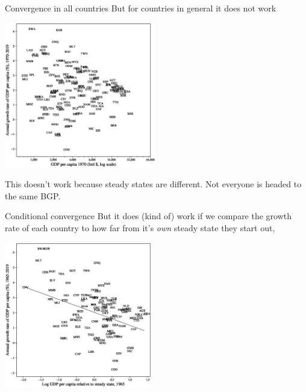 \begin{frame}{Convergence in all countries}
But for countries in general it does not work
\begin{center}
\includegraphics[height = 2.5in]{../Figures/fig-ch3-fig8.eps}
\end{center}
This doesn't work because steady states are different. Not everyone is headed to the same BGP.
\end{frame}

\begin{frame}{Conditional convergence}
But it does (kind of) work if we compare the growth rate of each country to how far from it's \textit{own} steady state they start out,
\begin{center}
\includegraphics[height = 2.5in]{../Figures/fig-ch3-fig9.eps}
\end{center}
\end{frame}

